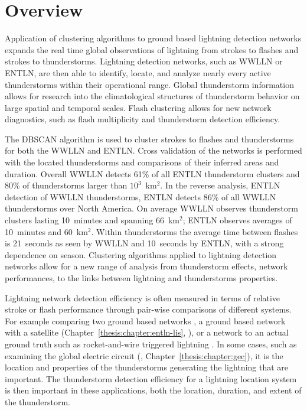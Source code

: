 \section{Overview}

Application of clustering algorithms to ground based lightning detection networks expands the real time global observations of lightning from strokes to flashes and strokes to thunderstorms.
Lightning detection networks, such as WWLLN or ENTLN, are then able to identify, locate, and analyze nearly every active thunderstorms within their operational range.
Global thunderstorm information allows for research into the climatological structures of thunderstorm behavior on large spatial and temporal scales.
Flash clustering allows for new network diagnostics, such as flash multiplicity and thunderstorm detection efficiency.

The DBSCAN algorithm is used to cluster strokes to flashes and thunderstorms for both the WWLLN and ENTLN.
Cross validation of the networks is performed with the located thunderstorms and comparisons of their inferred areas and duration.
Overall WWLLN detects 61\% of all ENTLN thunderstorm clusters and 80\% of thunderstorms larger than $10^3$~km$^2$.
In the reverse analysis, ENTLN detection of WWLLN thunderstorms, ENTLN detects 86\% of all WWLLN thunderstorms over North America.
On average WWLLN observes thunderstorm clusters lasting 10~minutes and spanning 66~km$^2$; ENTLN observes averages of 10~minutes and 60~km$^2$.
Within thunderstorms the average time between flashes is 21~seconds as seen by WWLLN and 10~seconds by ENTLN, with a strong dependence on season.
Clustering algorithms applied to lightning detection networks allow for a new range of analysis from thunderstorm effects, network performances, to the links between lightning and thunderstorms properties.

Lightning network detection efficiency is often measured in terms of relative stroke or flash performance through pair-wise comparisons of different systems.
For example comparing two ground based networks \citep{Abarca2010}, a ground based network with a satellite (Chapter~\ref{thesis:chapter:entln-lis}, \citet{Rudlosky2013}), or a network to an actual ground truth such as rocket-and-wire triggered lightning \citep{Nag2011}.
In some cases, such as examining the global electric circuit (\citet{Hutchins2014}, Chapter~\ref{thesis:chapter:gec}), it is the location and properties of the thunderstorms generating the lightning that are important.
The thunderstorm detection efficiency for a lightning location system is then important in these applications, both the location, duration, and extent of the thunderstorm.

